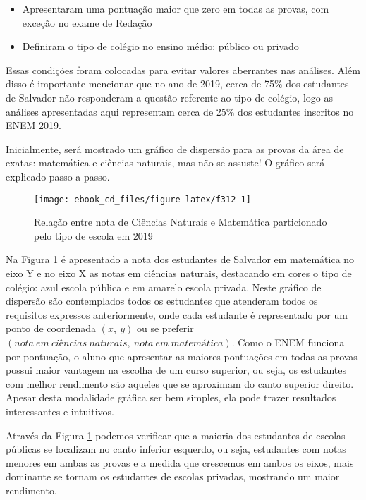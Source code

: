\documentclass[
  oneside]{book}
\begin{document}
\begin{itemize}
\item
  Apresentaram uma pontuação maior que zero em todas as provas, com exceção no exame de Redação
\item
  Definiram o tipo de colégio no ensino médio: público ou privado
\end{itemize}

Essas condições foram colocadas para evitar valores aberrantes nas análises. Além disso é importante mencionar que no ano de 2019, cerca de 75\% dos estudantes de Salvador não responderam a questão referente ao tipo de colégio, logo as análises apresentadas aqui representam cerca de 25\% dos estudantes inscritos no ENEM 2019.

Inicialmente, será mostrado um gráfico de dispersão para as provas da área de exatas: matemática e ciências naturais, mas não se assuste! O gráfico será explicado passo a passo.

\begin{figure}

{\centering \texttt{[image: ebook\_cd\_files/figure-latex/f312-1]} 

}

\caption{Relação entre nota de Ciências Naturais e Matemática particionado pelo tipo de escola em 2019}\label{fig:f312}
\end{figure}

Na Figura \ref{fig:f312} é apresentado a nota dos estudantes de Salvador em matemática no eixo Y e no eixo X as notas em ciências naturais, destacando em cores o tipo de colégio: azul escola pública e em amarelo escola privada. Neste gráfico de dispersão são contemplados todos os estudantes que atenderam todos os requisitos expressos anteriormente, onde cada estudante é representado por um ponto de coordenada \((x,\ y)\) ou se preferir \((nota\ em\ ciências\ naturais,\ nota\ em\ matemática)\). Como o ENEM funciona por pontuação, o aluno que apresentar as maiores pontuações em todas as provas possui maior vantagem na escolha de um curso superior, ou seja, os estudantes com melhor rendimento são aqueles que se aproximam do canto superior direito. Apesar desta modalidade gráfica ser bem simples, ela pode trazer resultados interessantes e intuitivos.

Através da Figura \ref{fig:f312} podemos verificar que a maioria dos estudantes de escolas públicas se localizam no canto inferior esquerdo, ou seja, estudantes com notas menores em ambas as provas e a medida que crescemos em ambos os eixos, mais dominante se tornam os estudantes de escolas privadas, mostrando um maior rendimento.
\end{document}
